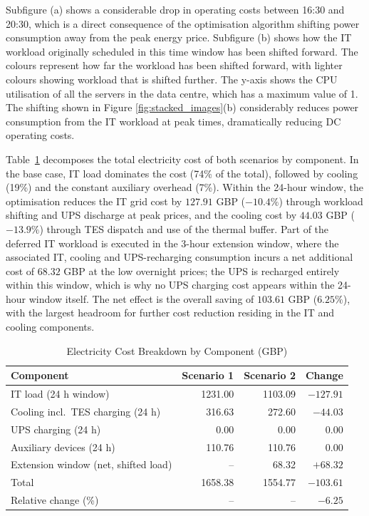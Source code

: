 \documentclass[lettersize,journal]{IEEEtran}
\newcommand{\rev}[1]{\textcolor{blue!70!black}{#1}}
\begin{document}
Subfigure (a) shows a considerable drop in operating costs between 16:30 and 20:30, which is a direct consequence of the optimisation algorithm shifting power consumption away from the peak energy price. Subfigure (b) shows how the IT workload originally scheduled in this time window has been shifted forward. The colours represent how far the workload has been shifted forward, with lighter colours showing workload that is shifted further. The y-axis shows the CPU utilisation of all the servers in the data centre, which has a maximum value of 1. The shifting shown in Figure \ref{fig:stacked_images}(b) considerably reduces power consumption from the IT workload at peak times, dramatically reducing DC operating costs.

\rev{Table~\ref{tab:cost-breakdown} decomposes the total electricity cost of both scenarios by component. In the base case, IT load dominates the cost (74\% of the total), followed by cooling (19\%) and the constant auxiliary overhead (7\%). Within the 24-hour window, the optimisation reduces the IT grid cost by $127.91$ GBP ($-10.4\%$) through workload shifting and UPS discharge at peak prices, and the cooling cost by $44.03$ GBP ($-13.9\%$) through TES dispatch and use of the thermal buffer. Part of the deferred IT workload is executed in the 3-hour extension window, where the associated IT, cooling and UPS-recharging consumption incurs a net additional cost of $68.32$ GBP at the low overnight prices; the UPS is recharged entirely within this window, which is why no UPS charging cost appears within the 24-hour window itself. The net effect is the overall saving of $103.61$ GBP ($6.25\%$), with the largest headroom for further cost reduction residing in the IT and cooling components.}

\begin{table}[!t]
\centering
\caption{\rev{Electricity Cost Breakdown by Component (GBP)}}
\label{tab:cost-breakdown}
\begin{scriptsize}
\rev{%
\begin{tabular}{lrrr}
\toprule
\textbf{Component} & \textbf{Scenario 1} & \textbf{Scenario 2} & \textbf{Change} \\
\midrule
IT load (24 h window) & 1231.00 & 1103.09 & $-127.91$ \\
Cooling incl.\ TES charging (24 h) & 316.63 & 272.60 & $-44.03$ \\
UPS charging (24 h) & 0.00 & 0.00 & 0.00 \\
Auxiliary devices (24 h) & 110.76 & 110.76 & 0.00 \\
Extension window (net, shifted load) & -- & 68.32 & $+68.32$ \\
\midrule
Total & 1658.38 & 1554.77 & $-103.61$ \\
Relative change (\%) & -- & -- & $-6.25$ \\
\bottomrule
\end{tabular}}%
\end{scriptsize}
\end{table}
\end{document}
